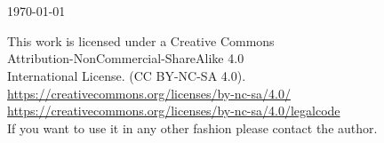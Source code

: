 \begin{titlepage}
\begin{center}

   \ %



   \ %

   \normalsize{\today}

\end{center}


\end{titlepage}




\clearpage
\thispagestyle{empty}
\raggedbottom

\vsmall
\noindent
This work is licensed under a Creative Commons \\
Attribution-NonCommercial-ShareAlike 4.0 \\
International License. (CC BY-NC-SA 4.0).\\
\url{https://creativecommons.org/licenses/by-nc-sa/4.0/} \\
\url{https://creativecommons.org/licenses/by-nc-sa/4.0/legalcode} \\
If you want to use it in any other fashion please contact the author.

\


\normalsize


















